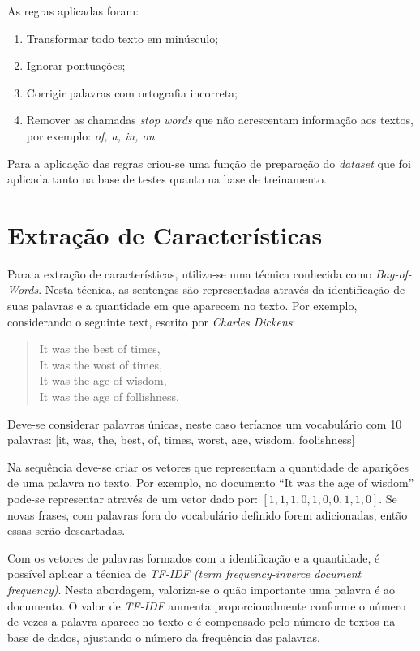 \documentclass[conference]{IEEEtran}
\begin{document}
As regras aplicadas foram:

\begin{enumerate}
    \item Transformar todo texto em minúsculo;
    \item Ignorar pontuações;
    \item Corrigir palavras com ortografia incorreta;
    \item Remover as chamadas \textit{stop words} que não acrescentam informação aos textos, por exemplo: \textit{of, a, in, on}.
\end{enumerate}

Para a aplicação das regras criou-se uma função de preparação do \textit{dataset} que foi aplicada tanto na base de testes quanto na base de treinamento.

\section{Extração de Características}

Para a extração de características, utiliza-se uma técnica conhecida como \textit{Bag-of-Words}. Nesta técnica, as sentenças são representadas através da identificação de suas palavras e a quantidade em que aparecem no texto. Por exemplo, considerando o seguinte text, escrito por \textit{Charles Dickens}:

\begin{quote}
    It was the best of times,\\
    It was the wost of times,\\
    It was the age of wisdom,\\
    It was the age of follishness.
\end{quote}

Deve-se considerar palavras únicas, neste caso teríamos um vocabulário com 10 palavras: [it, was,
the, best, of, times, worst, age, wisdom, foolishness]

Na sequência deve-se criar os vetores que representam a quantidade de aparições de uma palavra no texto. Por exemplo, no documento ``It was the age of wisdom'' pode-se representar através de um vetor dado por: $[1, 1, 1, 0, 1, 0, 0, 1, 1, 0]$. Se novas frases, com palavras fora do vocabulário definido forem adicionadas, então essas serão descartadas.

Com os vetores de palavras formados com a identificação e a quantidade, é possível aplicar a técnica de \textit{TF-IDF (term frequency-inverce document frequency)}. Nesta abordagem, valoriza-se o quão importante uma palavra é ao documento. O valor de \textit{TF-IDF} aumenta proporcionalmente conforme o número de vezes a palavra aparece no texto e é compensado pelo número de textos na base de dados, ajustando o número da frequência das palavras.
\end{document}
